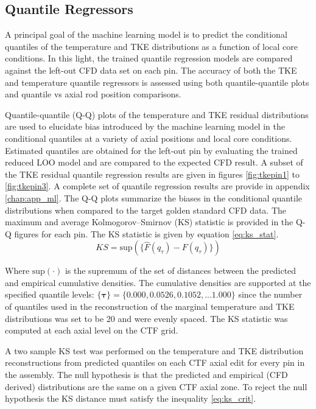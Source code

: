 \subsection{Quantile Regressors}

A principal goal of the machine learning model is to predict the conditional quantiles of the temperature and TKE distributions as a function of local core conditions.  In this light, the trained quantile regression models are compared against the left-out CFD data set on each pin.  The accuracy of both the TKE and temperature quantile regressors is assessed using both quantile-quantile plots and quantile vs axial rod position comparisons.

Quantile-quantile (Q-Q) plots of the temperature and TKE residual distributions are used to elucidate bias introduced by the machine learning model in the conditional quantiles at a variety of axial positions and local core conditions.  Estimated quantiles are obtained for the left-out pin by evaluating the trained reduced LOO model and are compared to the expected CFD result.
A subset of the TKE residual quantile regression results are given in figures \ref{fig:tkepin1} to \ref{fig:tkepin3}.  A complete set of quantile regression results are provide in appendix \ref{chap:app_ml}. The Q-Q plots summarize the biases in the conditional quantile distributions when compared to the target golden standard CFD data.  The maximum and average Kolmogorov–Smirnov (KS) statistic is provided in the Q-Q figures for each pin.  The KS statistic is given by equation \ref{eq:ks_stat}.
\begin{equation}
    KS = \mathrm{sup}(\{\hat F(q_{\tau}) - F(q_{\tau})\})
\label{eq:ks_stat}
\end{equation}

Where $\mathrm{sup}(\cdot)$ is the supremum of the set of distances between the predicted and empirical cumulative densities.  The cumulative densities are supported at the specified quantile levels: $\{\mathbf \tau\} = \{0.000, 0.0526, 0.1052, ... 1.000 \}$ since the number of quantiles used in the reconstruction of the marginal temperature and TKE distributions was set to be 20 and were evenly spaced.
The KS statistic was computed at each axial level on the CTF grid.

A two sample KS test was performed on the temperature and TKE distribution reconstructions from predicted quantiles on each CTF axial edit for every pin in the assembly. The null hypothesis is that the predicted and empirical (CFD derived) distributions are the same on a given CTF axial zone.  To reject the null hypothesis the KS distance must satisfy the inequality  \ref{eq:ks_crit}.

